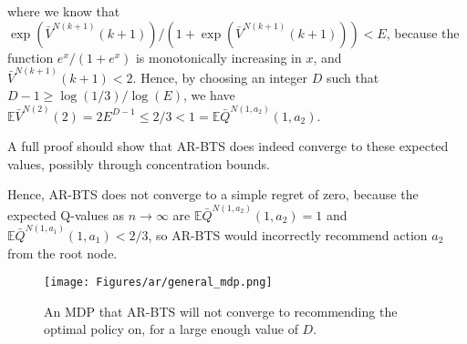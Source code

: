 \documentclass{article}
\newcommand{\crtodo}[1]{}
\newcommand{\bb}[1]{\mathbb{#1}}
\theoremstyle{plain}
\newenvironment{proofoutline}{\proof[Proof outline]}{\endproof}
\begin{document}
\begin{appendices}
\begin{proofoutline}
            where we know that $\exp\left(\bar{V}^{N(k+1)}(k+1)\right)/\left(1+\exp\left(\bar{V}^{N(k+1)}(k+1)\right)\right) < E$, because the function $e^x/(1+e^x)$ is monotonically increasing in $x$, and $\bar{V}^{N(k+1)}(k+1) < 2$. Hence, by choosing an integer $D$ such that $D-1 \geq \log(1/3) / \log(E)$, we have $\bb{E}\bar{V}^{N(2)}(2)=2E^{D-1}\leq 2/3 < 1 = \bb{E}\bar{Q}^{N(1,a_2)}(1,a_2)$. 

            A full proof should show that AR-BTS does indeed converge to these expected values, possibly through concentration bounds. 
            \crtodo{Do the full proof, and show that AR-BTS converges to these value with non zero prob, hence the non zero simple regret.} 

            Hence, AR-BTS does not converge to a simple regret of zero, because the expected Q-values as $n\rightarrow\infty$ are $\bb{E}\bar{Q}^{N(1,a_2)}(1,a_2)=1$ and $\bb{E}\bar{Q}^{N(1,a_1)}(1,a_1)<2/3$, so AR-BTS would incorrectly recommend action $a_2$ from the root node. 
            \crtodo{Formally give the simple regret converges to something strictly greater than zero. Also can I even do that intersection to product equality? Doesn't that mean that they are independent. Are they independent?}
        \end{proofoutline}
        
        \begin{figure}
            \centering
            \texttt{[image: Figures/ar/general\_mdp.png]}
            \caption{An MDP that AR-BTS will not converge to recommending the optimal policy on, for a large enough value of $D$.}
            \label{fig:ar_gen_mdp}
        \end{figure}




        
        




        

\end{appendices}
\end{document}
